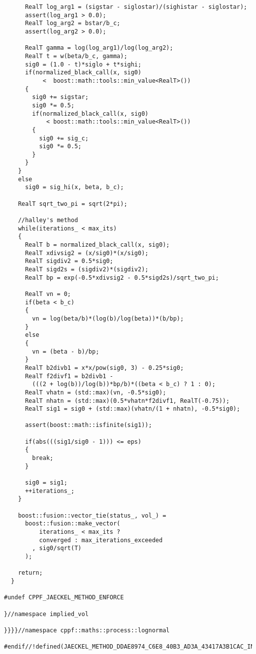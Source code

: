 \documentclass[a4paper,twoside,twocolumn]{article}
\begin{document}
\begin{verbatim}
      RealT log_arg1 = (sigstar - siglostar)/(sighistar - siglostar);
      assert(log_arg1 > 0.0);
      RealT log_arg2 = bstar/b_c;
      assert(log_arg2 > 0.0);

      RealT gamma = log(log_arg1)/log(log_arg2);
      RealT t = w(beta/b_c, gamma);
      sig0 = (1.0 - t)*siglo + t*sighi;
      if(normalized_black_call(x, sig0)
           <  boost::math::tools::min_value<RealT>())
      {
        sig0 += sigstar;
        sig0 *= 0.5;
        if(normalized_black_call(x, sig0)
            < boost::math::tools::min_value<RealT>())
        {
          sig0 += sig_c;
          sig0 *= 0.5;
        }
      }
    }
    else
      sig0 = sig_hi(x, beta, b_c);

    RealT sqrt_two_pi = sqrt(2*pi);
    
    //halley's method
    while(iterations_ < max_its)
    {
      RealT b = normalized_black_call(x, sig0);
      RealT xdivsig2 = (x/sig0)*(x/sig0);
      RealT sigdiv2 = 0.5*sig0;
      RealT sigd2s = (sigdiv2)*(sigdiv2);
      RealT bp = exp(-0.5*xdivsig2 - 0.5*sigd2s)/sqrt_two_pi;
  
      RealT vn = 0;
      if(beta < b_c)
      {
        vn = log(beta/b)*(log(b)/log(beta))*(b/bp);
      }
      else
      {
        vn = (beta - b)/bp;
      }
      RealT b2divb1 = x*x/pow(sig0, 3) - 0.25*sig0;
      RealT f2divf1 = b2divb1 -
        (((2 + log(b))/log(b))*bp/b)*((beta < b_c) ? 1 : 0);
      RealT vhatn = (std::max)(vn, -0.5*sig0);
      RealT nhatn = (std::max)(0.5*vhatn*f2divf1, RealT(-0.75));
      RealT sig1 = sig0 + (std::max)(vhatn/(1 + nhatn), -0.5*sig0);
  
      assert(boost::math::isfinite(sig1));

      if(abs(((sig1/sig0 - 1))) <= eps)
      {
        break;
      }

      sig0 = sig1;
      ++iterations_;
    }

    boost::fusion::vector_tie(status_, vol_) =
      boost::fusion::make_vector(
          iterations_ < max_its ?
          converged : max_iterations_exceeded
        , sig0/sqrt(T)
      );

    return;
  }

#undef CPPF_JAECKEL_METHOD_ENFORCE

}//namespace implied_vol

}}}}//namespace cppf::maths::process::lognormal

#endif//!defined(JAECKEL_METHOD_DDAE8974_C6E8_40B3_AD3A_43417A3B1CAC_INCLUDED)
\end{verbatim}
\end{document}
